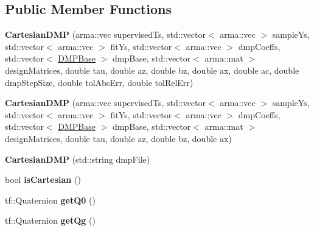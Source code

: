 \subsection*{Public Member Functions}
\begin{DoxyCompactItemize}
\item 
\hypertarget{classkukadu_1_1CartesianDMP_a1294c6512ad32f2687b61c04c1081f65}{{\bfseries Cartesian\-D\-M\-P} (arma\-::vec supervised\-Ts, std\-::vector$<$ arma\-::vec $>$ sample\-Ys, std\-::vector$<$ arma\-::vec $>$ fit\-Ys, std\-::vector$<$ arma\-::vec $>$ dmp\-Coeffs, std\-::vector$<$ \hyperlink{classkukadu_1_1DMPBase}{D\-M\-P\-Base} $>$ dmp\-Base, std\-::vector$<$ arma\-::mat $>$ design\-Matrices, double tau, double az, double bz, double ax, double ac, double dmp\-Step\-Size, double tol\-Abs\-Err, double tol\-Rel\-Err)}\label{classkukadu_1_1CartesianDMP_a1294c6512ad32f2687b61c04c1081f65}

\item 
\hypertarget{classkukadu_1_1CartesianDMP_a2618e25d1a5f435ce595c38480cc8dc1}{{\bfseries Cartesian\-D\-M\-P} (arma\-::vec supervised\-Ts, std\-::vector$<$ arma\-::vec $>$ sample\-Ys, std\-::vector$<$ arma\-::vec $>$ fit\-Ys, std\-::vector$<$ arma\-::vec $>$ dmp\-Coeffs, std\-::vector$<$ \hyperlink{classkukadu_1_1DMPBase}{D\-M\-P\-Base} $>$ dmp\-Base, std\-::vector$<$ arma\-::mat $>$ design\-Matrices, double tau, double az, double bz, double ax)}\label{classkukadu_1_1CartesianDMP_a2618e25d1a5f435ce595c38480cc8dc1}

\item 
\hypertarget{classkukadu_1_1CartesianDMP_a997fb24bb6822ffe0dfd9ae6baabf1eb}{{\bfseries Cartesian\-D\-M\-P} (std\-::string dmp\-File)}\label{classkukadu_1_1CartesianDMP_a997fb24bb6822ffe0dfd9ae6baabf1eb}

\item 
\hypertarget{classkukadu_1_1CartesianDMP_a5a34b24a6adb33e88d5850e6d3eaac0d}{bool {\bfseries is\-Cartesian} ()}\label{classkukadu_1_1CartesianDMP_a5a34b24a6adb33e88d5850e6d3eaac0d}

\item 
\hypertarget{classkukadu_1_1CartesianDMP_a705f7a1a000bfa01818272eadd44baaa}{tf\-::\-Quaternion {\bfseries get\-Q0} ()}\label{classkukadu_1_1CartesianDMP_a705f7a1a000bfa01818272eadd44baaa}

\item 
\hypertarget{classkukadu_1_1CartesianDMP_a955ca43e43d62e25dbd765b527fec609}{tf\-::\-Quaternion {\bfseries get\-Qg} ()}\label{classkukadu_1_1CartesianDMP_a955ca43e43d62e25dbd765b527fec609}


\end{DoxyCompactItemize}

